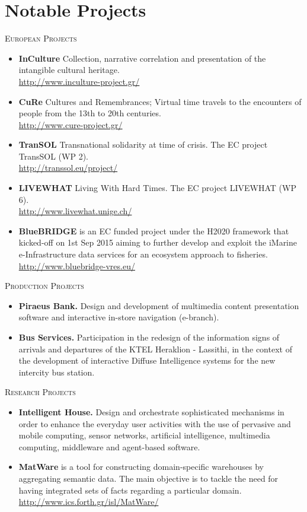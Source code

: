 \documentclass[11pt]{article}
\begin{document}
\section{Notable Projects}

\textsc{European Projects}
\begin{itemize}
\item
\textbf{InCulture} Collection, narrative correlation and presentation of the intangible cultural heritage. \\
\url{http://www.inculture-project.gr/}
\item
\textbf{CuRe} Cultures and Remembrances; Virtual time travels to the encounters of people from the 13th to 20th centuries. \\ 
\url{http://www.cure-project.gr/}
\item
\textbf{TranSOL} Transnational solidarity at time of crisis. The EC project TransSOL (WP 2). \\
\url{http://transsol.eu/project/}
\item
\textbf{LIVEWHAT} Living With Hard Times. The EC project LIVEWHAT (WP 6).  \\
\url{http://www.livewhat.unige.ch/}
\item
\textbf{BlueBRIDGE} is an EC funded project under the H2020 framework that kicked-off on 1st Sep 2015 aiming to further develop and exploit the iMarine e-Infrastructure data services for an ecosystem approach to fisheries. \\
\url{http://www.bluebridge-vres.eu/}
\end{itemize}

\textsc{Production Projects}
\begin{itemize}
\item
\textbf{Piraeus Bank.} Design and development of multimedia content presentation software and interactive in-store navigation (e-branch).
\item
\textbf{Bus Services.} Participation in the redesign of the information signs of arrivals and departures of the KTEL Heraklion - Lassithi, in the context of the development of interactive Diffuse Intelligence systems for the new intercity bus station.
\end{itemize}

\textsc{Research Projects}
\begin{itemize}
\item
\textbf{Intelligent House.} Design and orchestrate sophisticated mechanisms in order to enhance the everyday user activities with the use of pervasive and mobile computing, sensor networks, artificial intelligence, multimedia computing, middleware and agent-based software.
\item
\textbf{MatWare} is a tool for constructing domain-specific warehouses by aggregating semantic data. The main objective is to tackle the need for having integrated sets of facts regarding a particular domain. \url{http://www.ics.forth.gr/isl/MatWare/}
\end{itemize}
\end{document}
